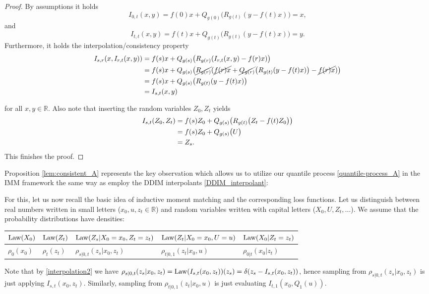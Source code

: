 \documentclass{article}
\newcommand{\R}{\mathbb{R}}
\theoremstyle{plain}
\theoremstyle{definition}
\theoremstyle{remark}
\begin{document}
\begin{proof}
By  assumptions it holds 
\begin{equation*}
   I_{0,t}(x, y) = f(0) x + Q_{g(0)}\big(R_{g(t)}(y - f(t)x) \big) = x,
\end{equation*}
and 
\begin{equation*}
   I_{t,t}(x, y) = f(t) x + Q_{g(t)}\big(R_{g(t)}(y - f(t)x) \big) = y.
\end{equation*}
Furthermore, it holds the interpolation/consistency property
\begin{align}\label{interpolation1}
    I_{s,r}(x,  I_{r,t}(x,y)) 
    &= f(s) x + Q_{g(s)}\big(R_{g(r)}( I_{r,t}(x,y) - f(r)x) \big) \notag\\
    &= f(s) x + Q_{g(s)}\big( \cancel{R_{g(r)}} ( \cancel{f(r)x} + \cancel{Q_{g(r)}}\big(R_{g(t)}(y - f(t)x) \big) - \cancel{f(r)x}) \big)
    \notag\\
    &= f(s) x + Q_{g(s)}\big( R_{g(t)}(y - f(t)x) \big) \notag\\
    &= I_{s,t}(x,y)
\end{align}

for all $x, y \in \mathbb{R}$.
Also note that inserting the random variables $Z_0, Z_t$ yields
\begin{align}
    I_{s,t}(Z_0, Z_t) &= f(s) Z_0 + Q_{g(s)}\big(R_{g(t)} \big(Z_t - f(t)Z_0 \big) \big) \notag\\
    &= f(s) Z_0 + Q_{g(s)}\big( U \big) \notag\\
    &= Z_s.
\end{align}
This finishes the proof.
\end{proof}

Proposition \ref{lem:consistent_A} represents the key observation which allows us to utilize our quantile process \eqref{quantile-process_A} in the IMM framework the same way as \cite{IMM2025} employ the DDIM interpolants \eqref{DDIM_interpolant}:

For this, let us now recall the basic idea of inductive moment matching and the corresponding loss functions.
Let us distinguish between real numbers written in small letters ($x_0, u, z_t \in \R$) and random variables written with capital letters ($X_0, U, Z_t,\ldots$). 
We assume that the probability distributions have densities:
{\small{
\begin{center}
\begin{tabular}{l|l|l|l|l}
${\rm Law}(X_0)$&${\rm Law}(Z_t)$&${\rm Law}(Z_s | X_0 = x_0, Z_t = z_t)$& ${\rm Law}(Z_t | X_0 = x_0, U = u)$&${\rm Law}(X_0| Z_t = z_t)$
\\
\hline
$\rho_{0}(x_0)$
&$\rho_{t}(z_t)$
&$\rho_{s|0, t}(z_s|x_0, z_t)$
&$\rho_{t|0, 1}(z_t|x_0, u)$
&$\rho_{0|t}(x_0|z_t)$
\end{tabular}
\end{center}
}}
Note that by \eqref{interpolation2} we have $\rho_{s|0, t}(z_s|x_0, z_t) = {\rm Law}(I_{s,t}(x_0, z_t))(z_s) = \delta(z_s - I_{s,t}(x_0, z_t))$, hence sampling from $\rho_{s|0, t}(z_s|x_0, z_t)$ is just applying $I_{s,t}(x_0, z_t)$.
Similarly, sampling from $\rho_{t|0, 1}(z_t|x_0, u)$ is just evaluating $I_{t,1}(x_0, Q_1(u))$.
\end{document}
